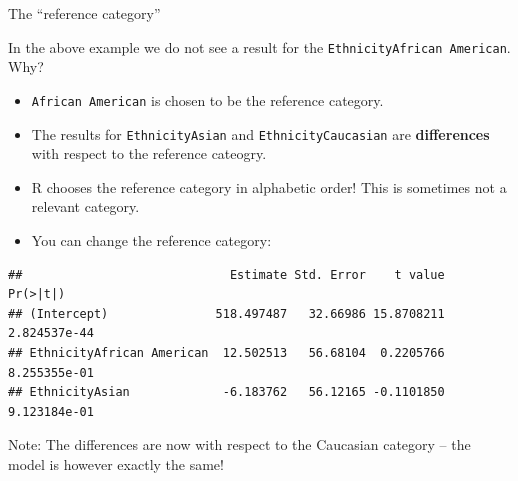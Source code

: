 \documentclass[10pt,ignorenonframetext,]{beamer}
\newenvironment{Shaded}{\begin{snugshade}}{\end{snugshade}}
\newcommand{\KeywordTok}[1]{\textcolor[rgb]{0.13,0.29,0.53}{\textbf{#1}}}
\newcommand{\DataTypeTok}[1]{\textcolor[rgb]{0.13,0.29,0.53}{#1}}
\newcommand{\StringTok}[1]{\textcolor[rgb]{0.31,0.60,0.02}{#1}}
\newcommand{\OperatorTok}[1]{\textcolor[rgb]{0.81,0.36,0.00}{\textbf{#1}}}
\newcommand{\NormalTok}[1]{#1}
\providecommand{\tightlist}{%
  \setlength{\itemsep}{0pt}\setlength{\parskip}{0pt}}
\begin{document}
\begin{frame}[fragile]

\begin{block}{The ``reference category''}

\vspace{2mm} In the above example we do not see a result for the
\texttt{EthnicityAfrican\ American}. Why?

\begin{itemize}
\tightlist
\item
  \texttt{African\ American} is chosen to be the reference category.
\item
  The results for \texttt{EthnicityAsian} and
  \texttt{EthnicityCaucasian} are \textbf{differences} with respect to
  the reference cateogry.
\item
  R chooses the reference category in alphabetic order! This is
  sometimes not a relevant category.
\item
  You can change the reference category:
\end{itemize}

\scriptsize

\begin{Shaded}
\end{Shaded}

\begin{verbatim}
##                             Estimate Std. Error    t value     Pr(>|t|)
## (Intercept)               518.497487   32.66986 15.8708211 2.824537e-44
## EthnicityAfrican American  12.502513   56.68104  0.2205766 8.255355e-01
## EthnicityAsian             -6.183762   56.12165 -0.1101850 9.123184e-01
\end{verbatim}

\small
Note: The differences are now with respect to the Caucasian category --
the model is however exactly the same!

\end{block}

\end{frame}
\end{document}
